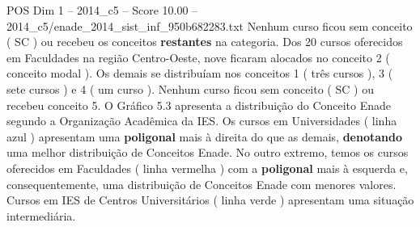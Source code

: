 \begin{textsample}{POS Dim 1 – 2014\_c5 – Score 10.00 – 2014\_c5/enade\_2014\_sist\_inf\_950b682283.txt}
Nenhum curso ficou sem conceito ( SC ) ou recebeu os conceitos \textbf{restantes} na categoria.
Dos 20 cursos oferecidos em Faculdades na região Centro-Oeste, nove ficaram alocados no conceito 2 ( conceito modal ).
Os demais se distribuíam nos conceitos 1 ( três cursos ), 3 ( sete cursos ) e 4 ( um curso ).
Nenhum curso ficou sem conceito ( SC ) ou recebeu conceito 5.
O Gráfico 5.3 apresenta a distribuição do Conceito Enade segundo a Organização Acadêmica da IES.
Os cursos em Universidades ( linha azul ) apresentam uma \textbf{poligonal} mais à direita do que as demais, \textbf{denotando} uma melhor distribuição de Conceitos Enade.
No outro extremo, temos os cursos oferecidos em Faculdades ( linha vermelha ) com a \textbf{poligonal} mais à esquerda e, consequentemente, uma distribuição de Conceitos Enade com menores valores.
Cursos em IES de Centros Universitários ( linha verde ) apresentam uma situação intermediária.

\end{textsample}
